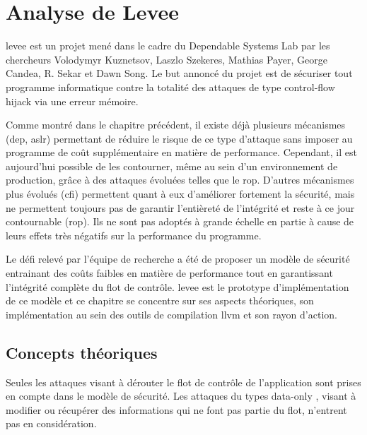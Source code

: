 \chapter{Analyse de Levee}
\label{chap:levee}


\gls{levee} est un projet mené dans le cadre du Dependable Systems Lab \cite{dslab} par les chercheurs Volodymyr Kuznetsov, Laszlo Szekeres, Mathias Payer, George Candea, R. Sekar et Dawn Song. Le but annoncé du projet est de sécuriser tout programme informatique contre la totalité des attaques de type \og control-flow hijack \fg via une erreur mémoire.

Comme montré dans le chapitre précédent, il existe déjà plusieurs mécanismes (\gls{dep}, \gls{aslr}) permettant de réduire le risque de ce type d'attaque sans imposer au programme de coût supplémentaire en matière de performance. Cependant, il est aujourd'hui possible de les contourner, même au sein d'un environnement de production, grâce à des attaques évoluées telles que le \gls{rop}. D'autres mécanismes plus évolués (\gls{cfi}) permettent quant à eux d'améliorer fortement la sécurité, mais ne permettent toujours pas de garantir l'entièreté de l'intégrité et reste à ce jour contournable (\gls{rop}). Ils ne sont pas adoptés à grande échelle en partie à cause de leurs effets très négatifs sur la performance du programme.

Le défi relevé par l'équipe de recherche a été de proposer un modèle de sécurité entrainant des coûts faibles en matière de performance tout en garantissant l'intégrité complète du flot de contrôle. \gls{levee} est le prototype d'implémentation de ce modèle et ce chapitre se concentre sur ses aspects théoriques, son implémentation au sein des outils de compilation \gls{llvm} et son rayon d'action.

\minitoc

\newpage

\section{Concepts théoriques}

Seules les attaques visant à dérouter le flot de contrôle de l'application sont prises en compte dans le modèle de sécurité. Les attaques du types \og data-only \fg, visant à modifier ou récupérer des informations qui ne font pas partie du flot, n'entrent pas en considération.

